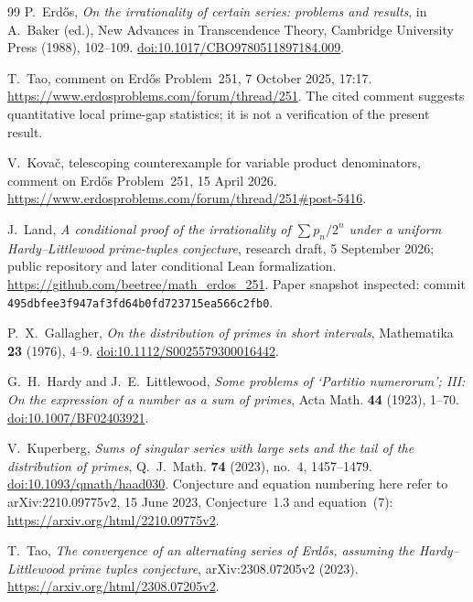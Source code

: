 \documentclass[11pt,a4paper]{article}
\begin{document}
{}
\begin{thebibliography}{99}
P.~Erd\H os, \emph{On the irrationality of certain series: problems and
results}, in A.~Baker (ed.), New Advances in Transcendence Theory,
Cambridge University Press (1988), 102--109.
\href{https://doi.org/10.1017/CBO9780511897184.009}{doi:10.1017/CBO9780511897184.009}.

T.~Tao, comment on Erd\H os Problem~251, 7 October 2025, 17:17.
\url{https://www.erdosproblems.com/forum/thread/251}.
The cited comment suggests quantitative local prime-gap statistics;
it is not a verification of the present result.

V.~Kova\v{c}, telescoping counterexample for variable product denominators,
comment on Erd\H os Problem~251, 15 April 2026.
\url{https://www.erdosproblems.com/forum/thread/251\#post-5416}.

J.~Land, \emph{A conditional proof of the irrationality of
$\sum p_n/2^n$ under a uniform Hardy--Littlewood prime-tuples conjecture},
research draft, 5 September 2026; public repository and later
conditional Lean formalization.
\url{https://github.com/beetree/math_erdos_251}.
Paper snapshot inspected: commit
\texttt{495dbfee3f947af3fd64b0fd723715ea566c2fb0}.

P.~X.~Gallagher, \emph{On the distribution of primes in short intervals},
Mathematika \textbf{23} (1976), 4--9.
\href{https://doi.org/10.1112/S0025579300016442}{doi:10.1112/S0025579300016442}.

G.~H.~Hardy and J.~E.~Littlewood, \emph{Some problems of `Partitio
numerorum'; III: On the expression of a number as a sum of primes},
Acta Math. \textbf{44} (1923), 1--70.
\href{https://doi.org/10.1007/BF02403921}{doi:10.1007/BF02403921}.

V.~Kuperberg, \emph{Sums of singular series with large sets and the tail
of the distribution of primes}, Q.~J.~Math. \textbf{74} (2023),
no.~4, 1457--1479.
\href{https://doi.org/10.1093/qmath/haad030}{doi:10.1093/qmath/haad030}.
Conjecture and equation numbering here refer to arXiv:2210.09775v2,
15 June 2023, Conjecture~1.3 and equation~(7):
\url{https://arxiv.org/html/2210.09775v2}.

T.~Tao, \emph{The convergence of an alternating series of Erd\H os,
assuming the Hardy--Littlewood prime tuples conjecture},
arXiv:2308.07205v2 (2023).
\url{https://arxiv.org/html/2308.07205v2}.


\end{thebibliography}
\end{document}

